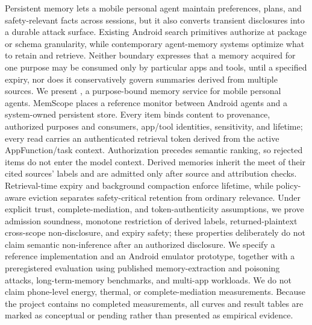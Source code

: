 Persistent memory lets a mobile personal agent maintain preferences, plans, and safety-relevant facts across sessions, but it also converts transient disclosures into a durable attack surface. Existing Android search primitives authorize at package or schema granularity, while contemporary agent-memory systems optimize what to retain and retrieve. Neither boundary expresses that a memory acquired for one purpose may be consumed only by particular apps and tools, until a specified expiry, nor does it conservatively govern summaries derived from multiple sources. We present \ms, a purpose-bound memory service for mobile personal agents. MemScope places a reference monitor between Android agents and a system-owned persistent store. Every item binds content to provenance, authorized purposes and consumers, app/tool identities, sensitivity, and lifetime; every read carries an authenticated retrieval token derived from the active AppFunction/task context. Authorization precedes semantic ranking, so rejected items do not enter the model context. Derived memories inherit the meet of their cited sources' labels and are admitted only after source and attribution checks. Retrieval-time expiry and background compaction enforce lifetime, while policy-aware eviction separates safety-critical retention from ordinary relevance. Under explicit trust, complete-mediation, and token-authenticity assumptions, we prove admission soundness, monotone restriction of derived labels, returned-plaintext cross-scope non-disclosure, and expiry safety; these properties deliberately do not claim semantic non-inference after an authorized disclosure. We specify a reference implementation and an Android emulator prototype, together with a preregistered evaluation using published memory-extraction and poisoning attacks, long-term-memory benchmarks, and multi-app workloads. We do not claim phone-level energy, thermal, or complete-mediation measurements. Because the project contains no completed measurements, all curves and result tables are marked as conceptual or pending rather than presented as empirical evidence.
